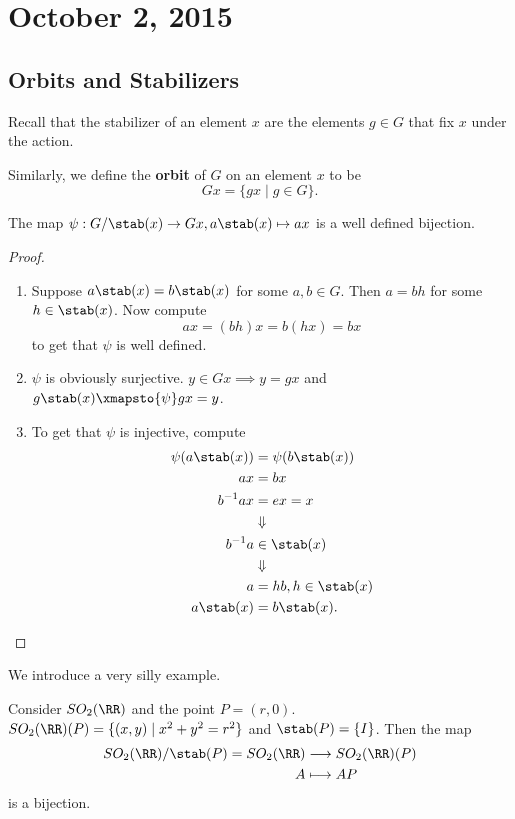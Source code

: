 \section{October 2, 2015}

\subsection{Orbits and Stabilizers}
Recall that the stabilizer of an element $x$ are the elements $g \in G$
that fix $x$ under the action.

\begin{df}
Similarly, we define the \textbf{orbit} of $G$ on an element $x$ to be
\[ Gx = \lbrace gx \mid g \in G \rbrace. \]
\end{df}

\begin{prop}
The map $\psi : G / \stab(x) \to Gx, a \stab(x) \mapsto ax$ is a well
defined bijection.
\end{prop}

\begin{proof}
$ $
\begin{enumerate}
\item Suppose $a\stab(x) = b\stab(x)$ for some $a, b \in G$. Then $a =
bh$ for some $h \in \stab(x)$. Now compute
\[ ax = (bh)x = b(hx) = bx \]
to get that $\psi$ is well defined.
\item $\psi$ is obviously surjective. $y \in Gx \implies y = gx$ and
$g \stab(x) \xmapsto{\psi} gx = y$.
\item To get that $\psi$ is injective, compute
\[ \begin{aligned}
\psi(a \stab(x)) &= \psi(b \stab(x)) \\
ax &= bx \\
b^{-1}ax &= ex = x \\
&\Downarrow \\
b^{-1}a &\in \stab(x) \\
&\Downarrow \\
a &= hb, h \in \stab(x) \\
a\stab(x) &= b\stab(x). \\
\end{aligned} \]
\end{enumerate}
\end{proof}

\begin{ex}
We introduce a very silly example.

Consider $SO_2(\RR)$ and the point $P = (r, 0)$. $SO_2(\RR)(P) = \lbrace
(x, y) \mid x^2 + y^2 = r^2 \rbrace$ and $\stab(P) = \lbrace I \rbrace$.
Then the map
\[ \begin{aligned}
SO_2(\RR) / \stab(P) = SO_2(\RR) &\longrightarrow SO_2(\RR)(P) \\
A &\longmapsto AP \\
\end{aligned} \]
is a bijection.
\end{ex}


